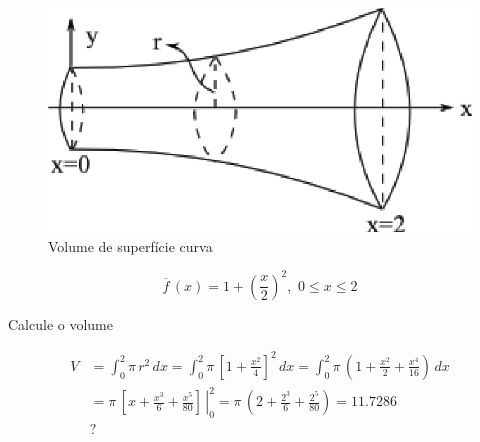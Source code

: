 \begin{example}

\begin{figure}[htb]
 \centering
 \includegraphics[scale=1.0]{capitulos/capitulo2/figuras/regra_trapezio3.eps}
 \caption{Volume de superfície curva}
 \label{fig:regra_trapezio2}
\end{figure}

\[
 \overline{f}\,(x) = 1 + \left( \frac{x}{2} \right)^2, \, \, 0 \leq x \leq 2
\]

Calcule o volume

\[
 \begin{array}{ll}
  V & = \displaystyle \int_0^2 \pi \, r^2 \, dx = \int_0^2 \pi \, \left[ 1 + \frac{x^2}{4} \right]^2 \, dx = \int_0^2 \pi \, \left( 1 + \frac{x^2}{2} + \frac{x^4}{16} \right) \, dx \\
    & = \left. \pi \, \left[ x + \displaystyle \frac{x^3}{6} + \frac{x^5}{80} \right] \displaystyle \, \right|_0^2 = \pi \, \left(2 + \displaystyle \frac{2^3}{6} + \frac{2^5}{80}\right) = 11.7286 \\
    & ?
 \end{array}
\]

\end{example}